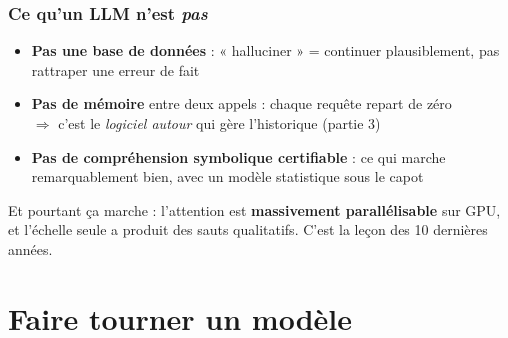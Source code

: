 \documentclass[
	11pt,
	aspectratio=169
]{beamer}
\begin{document}
\begin{frame}
    \frametitle{Ce qu'un LLM n'est \emph{pas}}
    \begin{itemize}\setlength\itemsep{0.5em}
        \item \textbf{Pas une base de données} : « halluciner » = continuer plausiblement, pas rattraper une erreur de fait
        \item \textbf{Pas de mémoire} entre deux appels : chaque requête repart de zéro \\ $\Rightarrow$ c'est le \emph{logiciel autour} qui gère l'historique (partie 3)
        \item \textbf{Pas de compréhension symbolique certifiable} : ce qui marche remarquablement bien, avec un modèle statistique sous le capot
    \end{itemize}
    \vfill
    \begin{center}
        \begin{block}{}
            Et pourtant ça marche : l'attention est \textbf{massivement parallélisable} sur GPU, et l'échelle seule a produit des sauts qualitatifs. C'est la leçon des 10 dernières années.
        \end{block}
    \end{center}
\end{frame}

\section{Faire tourner un modèle}
\end{document}
